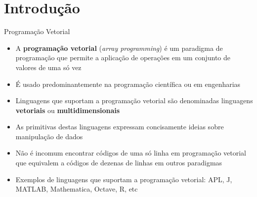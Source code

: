 \section{Introdução}

\begin{frame}[fragile]{Programação Vetorial}

    \begin{itemize}
        \item A \textbf{programação vetorial} (\textit{array programming}) é um paradigma de 
            programação que permite a aplicação de operações em um conjunto de valores de uma só vez
        \pause

        \item É usado predominantemente na programação científica ou em engenharias
        \pause

        \item Linguagens que suportam a programação vetorial são denominadas linguagens 
            \textbf{vetoriais} ou \textbf{multidimensionais}
        \pause

        \item As primitivas destas linguagens expressam concisamente ideias sobre manipulação de 
            dados
        \pause
        \item Não é incomum encontrar códigos de uma só linha em programação vetorial que equivalem
            a códigos de dezenas de linhas em outros paradigmas
        \pause

        \item Exemplos de linguagens que suportam a programação vetorial: APL, J, MATLAB, 
            Mathematica, Octave, R, etc
    \end{itemize}

\end{frame}

